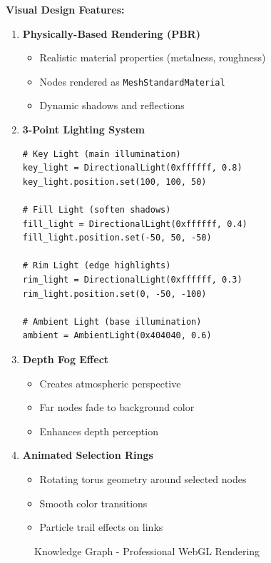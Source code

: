\textbf{Visual Design Features:}
\begin{enumerate}
    \item \textbf{Physically-Based Rendering (PBR)}
    \begin{itemize}
        \item Realistic material properties (metalness, roughness)
        \item Nodes rendered as \texttt{MeshStandardMaterial}
        \item Dynamic shadows and reflections
    \end{itemize}
    
    \item \textbf{3-Point Lighting System}
    \begin{lstlisting}[style=pythonstyle]
# Key Light (main illumination)
key_light = DirectionalLight(0xffffff, 0.8)
key_light.position.set(100, 100, 50)

# Fill Light (soften shadows)
fill_light = DirectionalLight(0xffffff, 0.4)
fill_light.position.set(-50, 50, -50)

# Rim Light (edge highlights)
rim_light = DirectionalLight(0xffffff, 0.3)
rim_light.position.set(0, -50, -100)

# Ambient Light (base illumination)
ambient = AmbientLight(0x404040, 0.6)
    \end{lstlisting}
    
    \item \textbf{Depth Fog Effect}
    \begin{itemize}
        \item Creates atmospheric perspective
        \item Far nodes fade to background color
        \item Enhances depth perception
    \end{itemize}
    
    \item \textbf{Animated Selection Rings}
    \begin{itemize}
        \item Rotating torus geometry around selected nodes
        \item Smooth color transitions
        \item Particle trail effects on links
    \end{itemize}
\end{enumerate}

\begin{figure}[h]
\centering
{}
\caption{Knowledge Graph - Professional WebGL Rendering}
\label{fig:webgl-graph}
\end{figure}

